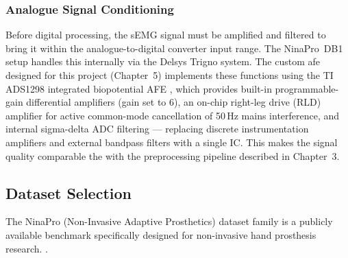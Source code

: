 \documentclass[11pt]{article}
\begin{document}
\subsubsection{Analogue Signal Conditioning}
Before digital processing, the sEMG signal must be amplified and filtered to bring it within the analogue-to-digital converter input range. The NinaPro~DB1 setup handles this internally via the Delsys Trigno system. The custom \gls{afe} designed for this project (Chapter~5) implements these functions using the TI ADS1298 integrated biopotential AFE \cite{ads1298datasheet}, which provides built-in programmable-gain differential amplifiers (gain set to 6), an on-chip right-leg drive (RLD) amplifier for active common-mode cancellation of 50\,Hz mains interference, and internal sigma-delta ADC filtering — replacing discrete instrumentation amplifiers and external bandpass filters with a single IC. This makes the signal quality comparable the with the preprocessing pipeline described in Chapter~3.



\subsection{Dataset Selection}
The NinaPro (Non-Invasive Adaptive Prosthetics) dataset family is a publicly available benchmark specifically designed for non-invasive hand prosthesis research. \cite{atzori2014ninapro,atzori2015resource}. 
\end{document}
